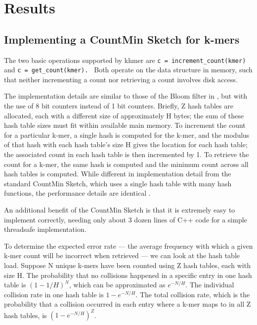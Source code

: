 \documentclass[10pt]{article}
\begin{document}
\section*{Results}

\subsection*{Implementing a CountMin Sketch for k-mers}

The two basic operations supported by khmer are {\tt c =
  increment\_count(kmer) } and {\tt c = get\_count(kmer). }
Both operate on the data structure in memory, such that neither
incrementing a count nor retrieving a count involves disk
access.

The implementation details are similar to those of the Bloom filter in
\cite{Pell2012}, but with the use of 8 bit counters instead of 1 bit
counters.  Briefly, Z hash tables are allocated, each with a different
size of approximately H bytes; the sum of these hash table sizes must
fit within available main memory.  To increment the count for a
particular k-mer, a single hash is computed for the k-mer, and the
modulus of that hash with each hash table's size H gives the location
for each hash table; the associated count in each hash table is then
incremented by 1.  To retrieve the count for a k-mer, the same hash is
computed and the minimum count across all hash tables is computed.
While different in implementation detail from the standard CountMin Sketch,
which uses a single hash table with many hash
functions, the performance details are identical \cite{Pell2012}.

An additional benefit of the CountMin Sketch is that it is extremely
easy to implement correctly, needing only about 3 dozen lines of C++
code for a simple threadsafe implementation.

To determine the expected error rate --- the average frequency
with which a given k-mer count will be incorrect when retrieved --- we
can look at the hash table load. Suppose N unique k-mers have been
counted using Z hash tables, each with size H.  The probability that
no collisions happened in a specific entry in one hash table is
$(1-1/H)^{N}$, which can be approximated as $e^{-N/H}$. The individual
collision rate in one hash table is $1-e^{-N/H}$. The total collision
rate, which is the probability that a collision occurred in each entry
where a k-mer maps to in all Z hash tables, is $(1-e^{-N/H})^{Z}$.
\end{document}
